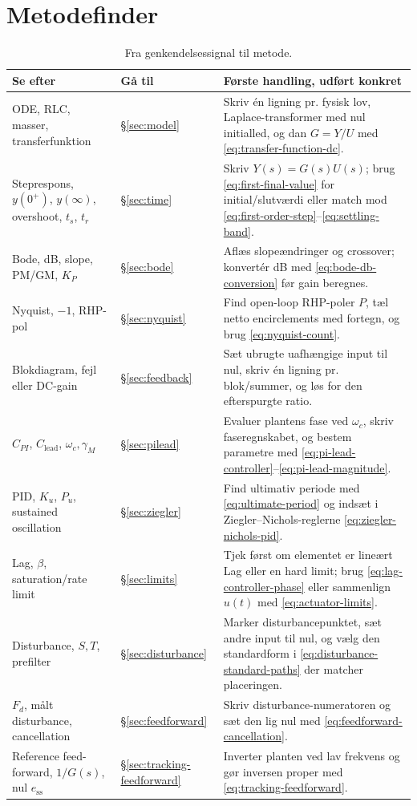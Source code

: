 \section{Metodefinder}
\label{sec:metodefinder}

\begin{table}[htbp]
\centering
\caption{Fra genkendelsessignal til metode.}
\label{tab:metodefinder}
\begin{tabularx}{\textwidth}{@{}p{}Y Y@{}}
\toprule
Se efter & Gå til & Første handling, udført konkret \\
\midrule
ODE, RLC, masser, transferfunktion & \S\ref{sec:model} & Skriv én ligning pr. fysisk lov, Laplace-transformer med nul initialled, og dan \(G=Y/U\) med \eqref{eq:transfer-function-dc}. \\
Steprespons, \(y(0^+)\), \(y(\infty)\), overshoot, \(t_s\), \(t_r\) & \S\ref{sec:time} & Skriv \(Y(s)=G(s)U(s)\); brug \eqref{eq:first-final-value} for initial/slutværdi eller match mod \eqref{eq:first-order-step}--\eqref{eq:settling-band}. \\
Bode, dB, slope, PM/GM, \(K_P\) & \S\ref{sec:bode} & Aflæs slopeændringer og crossover; konvertér dB med \eqref{eq:bode-db-conversion} før gain beregnes. \\
Nyquist, \(-1\), RHP-pol & \S\ref{sec:nyquist} & Find open-loop RHP-poler \(P\), tæl netto encirclements med fortegn, og brug \eqref{eq:nyquist-count}. \\
Blokdiagram, fejl eller DC-gain & \S\ref{sec:feedback} & Sæt ubrugte uafhængige input til nul, skriv én ligning pr. blok/summer, og løs for den efterspurgte ratio. \\
\(C_{PI}\), \(C_{\mathrm{lead}}\), \(\omega_c,\gamma_M\) & \S\ref{sec:pilead} & Evaluer plantens fase ved \(\omega_c\), skriv faseregnskabet, og bestem parametre med \eqref{eq:pi-lead-controller}--\eqref{eq:pi-lead-magnitude}. \\
PID, \(K_u\), \(P_u\), sustained oscillation & \S\ref{sec:ziegler} & Find ultimativ periode med \eqref{eq:ultimate-period} og indsæt i Ziegler--Nichols-reglerne \eqref{eq:ziegler-nichols-pid}. \\
Lag, \(\beta\), saturation/rate limit & \S\ref{sec:limits} & Tjek først om elementet er lineært Lag eller en hard limit; brug \eqref{eq:lag-controller-phase} eller sammenlign \(u(t)\) med \eqref{eq:actuator-limits}. \\
Disturbance, \(S,T\), prefilter & \S\ref{sec:disturbance} & Marker disturbancepunktet, sæt andre input til nul, og vælg den standardform i \eqref{eq:disturbance-standard-paths} der matcher placeringen. \\
\(F_d\), målt disturbance, cancellation & \S\ref{sec:feedforward} & Skriv disturbance-numeratoren og sæt den lig nul med \eqref{eq:feedforward-cancellation}. \\
Reference feed-forward, \(1/G(s)\), nul \(e_{\mathrm{ss}}\) & \S\ref{sec:tracking-feedforward} & Inverter planten ved lav frekvens og gør inversen proper med \eqref{eq:tracking-feedforward}. \\
\bottomrule
\end{tabularx}
\end{table}

